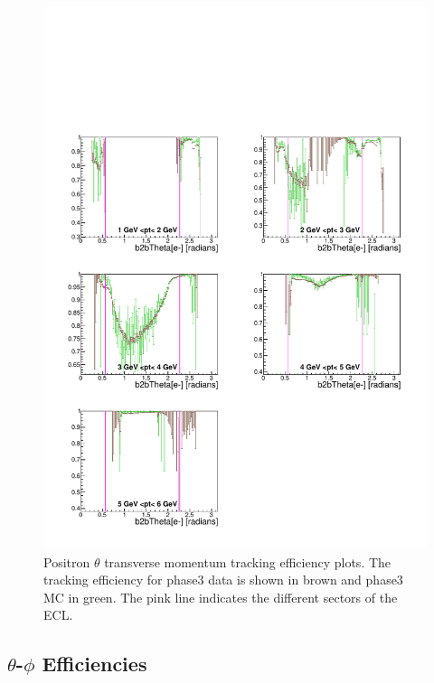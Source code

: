 \documentclass[a4paper,11pt,twosided,final,german,openbib,pdftex,listof=totoc,bibliography=totoc]{scrbook}
\begin{document}
\begin{figure}[!htbp]
	\centering
	\includegraphics[width=\textwidth]{Plots/master3/xPtMThetaepP3}
	\caption[Transverse Momentum $\theta$ Positron Efficiency Phase3]{Positron $\theta$ transverse momentum tracking efficiency plots. The tracking efficiency for phase3 data is shown in brown and phase3 MC in green. The pink line indicates the different sectors of the ECL.}
	\label{plt:xPtMThetaep3}
\end{figure}


\clearpage

\subsection{$\theta$-$\phi$ Efficiencies}
\label{sec:tpEff3}
\end{document}
